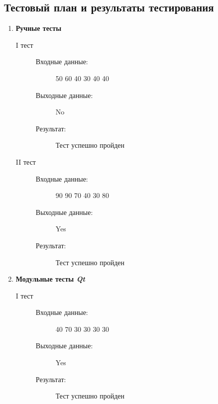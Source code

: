 \documentclass[12pt,a4paper]{report}
\begin{document}
\subsection{Тестовый план и результаты тестирования}
\begin{enumerate}
\item \textbf{Ручные тесты}
\begin{description}
\item[I тест]
\hspace{\parindent}
\begin{flushleft}
\begin{description}
\item[Входные данные:] 50 60 40 30 40 40
\item[Выходные данные:] No
\item[Результат:] Тест успешно пройден
\end{description}
\end{flushleft}
\end{description}

\begin{description}
\item[II тест]
\hspace{\parindent}
\begin{flushleft}
\begin{description}
\item[Входные данные:] 90 90 70 40 30 80
\item[Выходные данные:] Yes
\item[Результат:] Тест успешно пройден
\end{description}
\end{flushleft}
\end{description}

\item \textbf{Модульные тесты \textit{Qt}}
\begin{description}
\item[I тест]
\hspace{\parindent}
\begin{flushleft}
\begin{description}
\item[Входные данные:] 40 70 30 30 30 30
\item[Выходные данные:] Yes
\item[Результат:] Тест успешно пройден
\end{description}
\end{flushleft}
\end{description}


\end{enumerate}
\end{document}
